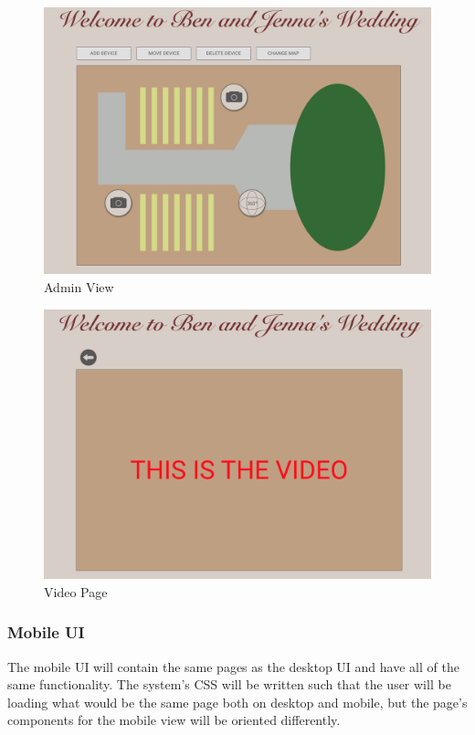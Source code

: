 \documentclass[onecolumn, draftclsnofoot,10pt, compsoc]{IEEEtran}
\begin{document}
        \begin{figure}[H]
            \centering
            \captionsetup{justification=centering,margin=2cm}
            \includegraphics[scale=0.2]{Images/desktop-admin.png}
            \centering\caption{Admin View}
            \label{fig:Admin}
        \end{figure}
        \begin{figure}[H]
            \centering
            \captionsetup{justification=centering,margin=2cm}
            \includegraphics[scale=0.2]{Images/desktop-video.png}
            \centering\caption{Video Page}
            \label{fig:Video}
        \end{figure}
        
        \subsubsection{Mobile UI}
        The mobile UI will contain the same pages as the desktop UI and have all of the same functionality. The system's CSS will be written such that the user will be loading what would be the same page both on desktop and mobile, but the page's components for the mobile view will be oriented differently. 
        
\end{document}
